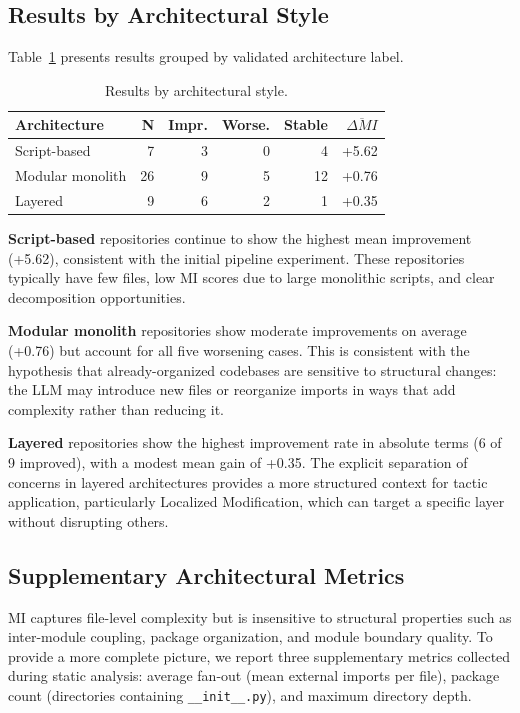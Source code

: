 \documentclass[sigconf,review,anonymous]{acmart}
\begin{document}
\subsection{Results by Architectural Style}

Table~\ref{tab:exp5_arch} presents results grouped by validated architecture label.

\begin{table}[H]
\centering
\small
\caption{Results by architectural style.}
\label{tab:exp5_arch}
\begin{tabular}{lrrrrr}
\toprule
\textbf{Architecture} & \textbf{N} & \textbf{Impr.} & \textbf{Worse.} & \textbf{Stable} & $\overline{\Delta MI}$ \\
\midrule
Script-based      & 7  & 3 & 0 & 4 & +5.62 \\
Modular monolith  & 26 & 9 & 5 & 12 & +0.76 \\
Layered           & 9  & 6 & 2 & 1  & +0.35 \\
\bottomrule
\end{tabular}
\end{table}

\textbf{Script-based} repositories continue to show the highest mean improvement (+5.62), consistent with the initial pipeline experiment. These repositories typically have few files, low MI scores due to large monolithic scripts, and clear decomposition opportunities.

\textbf{Modular monolith} repositories show moderate improvements on average (+0.76) but account for all five worsening cases. This is consistent with the hypothesis that already-organized codebases are sensitive to structural changes: the LLM may introduce new files or reorganize imports in ways that add complexity rather than reducing it.

\textbf{Layered} repositories show the highest improvement rate in absolute terms (6 of 9 improved), with a modest mean gain of +0.35. The explicit separation of concerns in layered architectures provides a more structured context for tactic application, particularly Localized Modification, which can target a specific layer without disrupting others.

\subsection{Supplementary Architectural Metrics}

MI captures file-level complexity but is insensitive to structural properties such as inter-module coupling, package organization, and module boundary quality. To provide a more complete picture, we report three supplementary metrics collected during static analysis: average fan-out (mean external imports per file), package count (directories containing \texttt{\_\_init\_\_.py}), and maximum directory depth.
\end{document}
